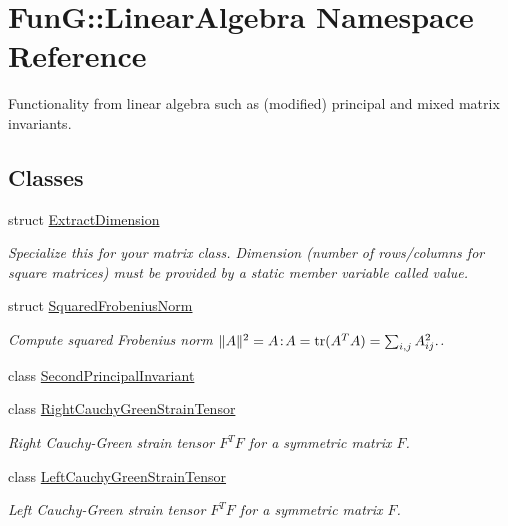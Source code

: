 \hypertarget{namespaceFunG_1_1LinearAlgebra}{\section{Fun\-G\-:\-:Linear\-Algebra Namespace Reference}
\label{namespaceFunG_1_1LinearAlgebra}
}


Functionality from linear algebra such as (modified) principal and mixed matrix invariants.  


\subsection*{Classes}
\begin{DoxyCompactItemize}
\item 
struct \hyperlink{structFunG_1_1LinearAlgebra_1_1ExtractDimension}{Extract\-Dimension}
\begin{DoxyCompactList}\small\item\em Specialize this for your matrix class. Dimension (number of rows/columns for square matrices) must be provided by a static member variable called value. \end{DoxyCompactList}\item 
struct \hyperlink{structFunG_1_1LinearAlgebra_1_1SquaredFrobeniusNorm}{Squared\-Frobenius\-Norm}
\begin{DoxyCompactList}\small\item\em Compute squared Frobenius norm $ \|A\|^2 = A\negthinspace : \negthinspace A = \mathrm{tr}(A^TA) = \sum_{i,j} A_{ij}^2. $. \end{DoxyCompactList}\item 
class \hyperlink{classFunG_1_1LinearAlgebra_1_1SecondPrincipalInvariant}{Second\-Principal\-Invariant}
\item 
class \hyperlink{classFunG_1_1LinearAlgebra_1_1RightCauchyGreenStrainTensor}{Right\-Cauchy\-Green\-Strain\-Tensor}
\begin{DoxyCompactList}\small\item\em Right Cauchy-\/\-Green strain tensor $ F^T F $ for a symmetric matrix $ F $. \end{DoxyCompactList}\item 
class \hyperlink{classFunG_1_1LinearAlgebra_1_1LeftCauchyGreenStrainTensor}{Left\-Cauchy\-Green\-Strain\-Tensor}
\begin{DoxyCompactList}\small\item\em Left Cauchy-\/\-Green strain tensor $ F^T F $ for a symmetric matrix $ F $. \end{DoxyCompactList}\item 

\end{DoxyCompactItemize}
